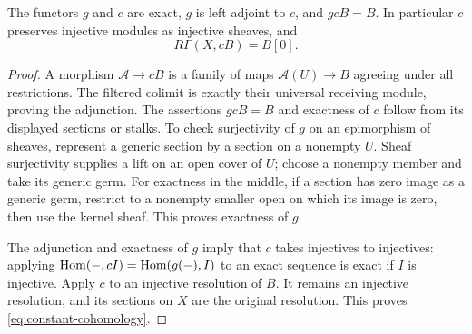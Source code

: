 \begin{lemma}\label{lem:generic}
The functors $g$ and $c$ are exact, $g$ is left adjoint to $c$, and
$gcB=B$. In particular $c$ preserves injective modules as injective
sheaves, and
\[
 R\Gamma(X,cB)=B[0].
 \tag{RP2}\label{eq:constant-cohomology}
\]
\end{lemma}
\begin{proof}
A morphism $\mathcal A\to cB$ is a family of maps
$\mathcal A(U)\to B$ agreeing under all restrictions. The filtered
colimit is exactly their universal receiving module, proving the
adjunction. The assertions $gcB=B$ and exactness of $c$ follow from its
displayed sections or stalks. To check surjectivity of $g$ on an
epimorphism of sheaves, represent a generic section by a section on a
nonempty $U$. Sheaf surjectivity supplies a lift on an open cover of
$U$; choose a nonempty member and take its generic germ. For exactness
in the middle, if a section has zero image as a generic germ, restrict
to a nonempty smaller open on which its image is zero, then use the
kernel sheaf. This proves exactness of $g$.

The adjunction and exactness of $g$ imply that $c$ takes injectives to
injectives: applying $\operatorname{Hom}(-,cI)=\operatorname{Hom}(g(-),I)$ to an exact sequence is
exact if $I$ is injective. Apply $c$ to an injective resolution of $B$.
It remains an injective resolution, and its sections on $X$ are the
original resolution. This proves \eqref{eq:constant-cohomology}.
\end{proof}

